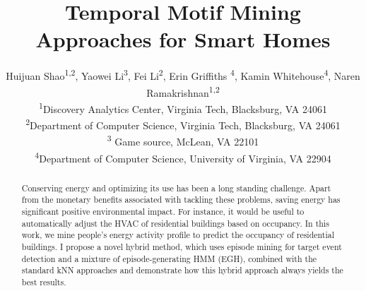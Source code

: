 \documentclass[sigconf]{acmart}
\begin{document}
\title{Temporal Motif Mining Approaches for Smart Homes}

\author{
  Huijuan Shao\textsuperscript{1,2}, Yaowei Li\textsuperscript{3}, Fei Li\textsuperscript{2}, Erin Griffiths \textsuperscript{4}, Kamin Whitehouse\textsuperscript{4}, Naren Ramakrishnan\textsuperscript{1,2} \\
  \textsuperscript{1}Discovery Analytics Center, Virginia Tech, Blacksburg, VA 24061 \\ %
  \textsuperscript{2}Department of Computer Science, Virginia Tech, Blacksburg, VA 24061 \\ %
    \textsuperscript{3} Game source, McLean, VA 22101 \\
  \textsuperscript{4}Department of Computer Science, University of Virginia, VA 22904 \\ %
}




\renewcommand{\shortauthors}{H. Shao et al.}


\begin{abstract}
Conserving energy and optimizing its use has been a long standing challenge. 
Apart from the monetary benefits associated with tackling these problems, saving energy has significant positive environmental impact. 
For instance, it would be useful to automatically adjust the HVAC of residential buildings based on occupancy.
In this work, we mine people's energy activity profile to predict the occupancy of residential buildings. I propose a novel hybrid method, which uses episode mining for target event  detection and a mixture of episode-generating HMM (EGH), 
combined with the standard kNN approaches and demonstrate how this hybrid approach always yields the best results.
\end{abstract}

%
%




\maketitle

%






%


 
\end{document}
